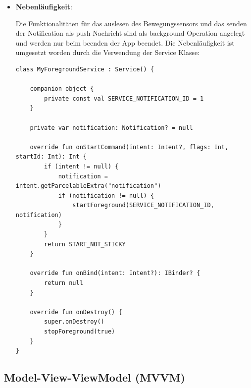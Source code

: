 \documentclass{article}
\begin{document}
\begin{itemize}
\item \textbf{Nebenläufigkeit}:

Die Funktionalitäten für das auslesen des Bewegungssensors und das senden der Notification als push Nachricht sind als background Operation angelegt und werden nur beim beenden der App beendet. Die Nebenläufigkeit ist umgesetzt worden durch die Verwendung der Service Klasse:
 \begin{lstlisting}
class MyForegroundService : Service() {

    companion object {
        private const val SERVICE_NOTIFICATION_ID = 1
    }

    private var notification: Notification? = null

    override fun onStartCommand(intent: Intent?, flags: Int, startId: Int): Int {
        if (intent != null) {
            notification = intent.getParcelableExtra("notification")
            if (notification != null) {
                startForeground(SERVICE_NOTIFICATION_ID, notification)
            }
        }
        return START_NOT_STICKY
    }

    override fun onBind(intent: Intent?): IBinder? {
        return null
    }

    override fun onDestroy() {
        super.onDestroy()
        stopForeground(true)
    }
}
\end{lstlisting}
\end{itemize}


\subsection{ Model-View-ViewModel (MVVM)}
\end{document}
